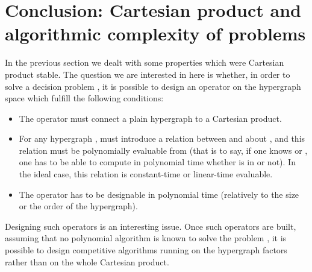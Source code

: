 \documentclass[copyright]{eptcs}
\begin{document}
\section{Conclusion: Cartesian product and algorithmic complexity of problems}
In the previous section we dealt with some properties which were Cartesian product stable. The question we are interested in here is whether, in order to solve a decision problem , it is possible to design an operator on the hypergraph space which fulfill the following conditions:
\begin{itemize}
 \item The operator  must connect a plain hypergraph to a Cartesian product.
 \item For any hypergraph ,  must introduce a relation between  and  about , and this relation must be polynomially evaluable from  (that is to say, if one knows  or , one has to be able to compute in polynomial time whether  is in  or not). In the ideal case, this relation is constant-time or linear-time evaluable.
 \item The operator  has to be designable in polynomial time (relatively to the size or the order of the hypergraph).
\end{itemize}
Designing such operators is an interesting issue. Once such operators are built, assuming that no polynomial algorithm is known to solve the problem , it is possible to design competitive algorithms running on the hypergraph factors rather than on the whole Cartesian product.\\





\end{document}
